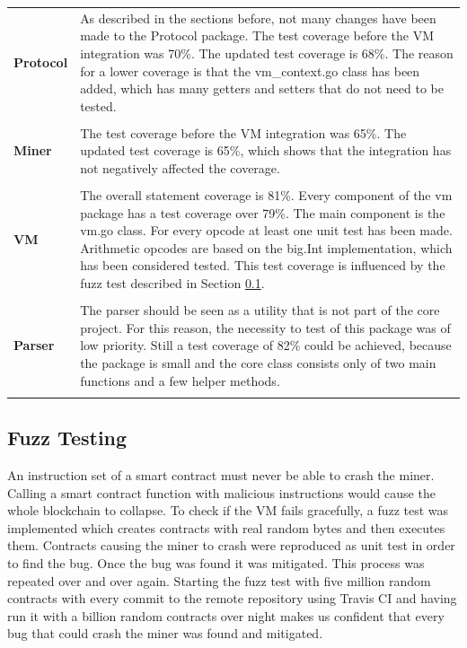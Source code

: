 \begin{tabular}[t]{ p{3cm} p{12.5cm}}
\raggedright
\textbf{Protocol} &
As described in the sections before, not many changes have been made to the Protocol package. The test coverage before the VM integration was 70\%. The updated test coverage is 68\%. The reason for a lower coverage is that the vm\_context.go class has been added, which has many getters and setters that do not need to be tested. \\ \\
\textbf{Miner} &
The test coverage before the VM integration was 65\%. The updated test coverage is 65\%, which shows that the integration has not negatively affected the coverage. \\ \\
\textbf{VM} &
The overall statement coverage is 81\%. Every component of the vm package has a test coverage over 79\%. The main component is the vm.go class. For every opcode at least one unit test has been made. Arithmetic opcodes are based on the big.Int implementation, which has been considered tested. This test coverage is influenced by the fuzz test described in Section \ref{fuzz_testing}. \\ \\
\textbf{Parser} &
The parser should be seen as a utility that is not part of the core project. For this reason, the necessity to test of this package was of low priority. Still a test coverage of 82\% could be achieved, because the package is small and the core class consists only of two main functions and a few helper methods. \\ \\
\end{tabular}
 
\subsection{Fuzz Testing} \label{fuzz_testing}
An instruction set of a smart contract must never be able to crash the miner. Calling a smart contract function with malicious instructions would cause the whole blockchain to collapse. To check if the VM fails gracefully, a fuzz test was implemented which creates contracts with real random bytes and then executes them. Contracts causing the miner to crash were reproduced as unit test in order to find the bug. Once the bug was found it was mitigated. This process was repeated over and over again. Starting the fuzz test with five million random contracts with every commit to the remote repository using Travis CI and having run it with a billion random contracts over night makes us confident that every bug that could crash the miner was found and mitigated. 

